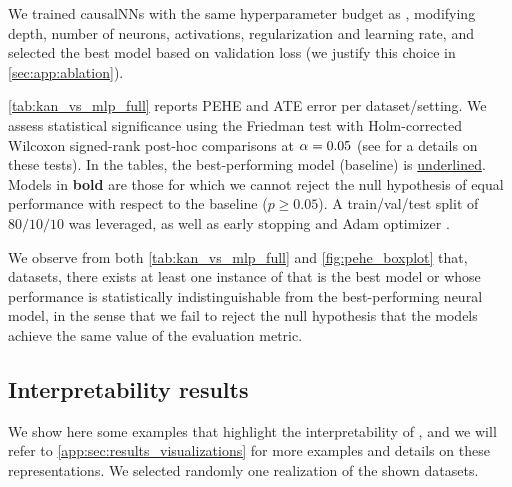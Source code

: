 We trained causalNNs with the same hyperparameter budget as \ours, modifying depth, number of neurons, activations, regularization and learning rate, and selected the best model based on validation loss (we justify this choice in \cref{sec:app:ablation}).


 \cref{tab:kan_vs_mlp_full} reports PEHE and ATE error per dataset/setting.  We assess statistical significance using the Friedman test with Holm-corrected 
Wilcoxon signed-rank post-hoc comparisons at $\alpha = 0.05$ (see \citet{demvsar2006statistical, rainio2024evaluation} for a details on these tests). 
In the tables, the best-performing model (baseline) is \underline{underlined}. 
Models in \textbf{bold} are those for which we cannot reject the null hypothesis 
of equal performance with respect to the baseline ($p \geq 0.05$). A train/val/test split of $80/10/10$ was leveraged, as well as early stopping and Adam optimizer \citep{Kingma2014AdamAM}.


We observe from both \cref{tab:kan_vs_mlp_full} and \cref{fig:pehe_boxplot} that,  datasets, there exists at least one instance of \our that is the best model or whose performance is statistically indistinguishable from the best-performing neural model,
\clearpage
in the sense that we fail to reject the null hypothesis that the models achieve the same value of the evaluation metric.

\subsection{Interpretability results}
We show here some examples that highlight the interpretability of \ours, and we will refer to \cref{app:sec:results_visualizations} for more examples and details on these representations. We selected randomly one realization of the shown datasets.

